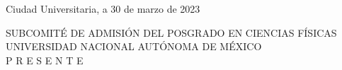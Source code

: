 \documentclass[letter,12pt]{article}
\numberwithin{equation}{section}
\begin{document}
\thispagestyle{empty}






\begin{flushright}
Ciudad Universitaria, a 30 de marzo de 2023
\end{flushright}
\vspace{-1.5mm}
SUBCOMITÉ DE ADMISIÓN DEL POSGRADO EN CIENCIAS FÍSICAS\\
UNIVERSIDAD NACIONAL AUTÓNOMA DE MÉXICO\\
P R E S E N T E \\
\end{document}
